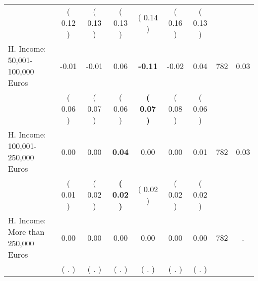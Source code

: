 \begin{tabular}{lcccccccc}
 & (     0.12 ) & (     0.13 ) & (     0.13 ) & (     0.14 ) & (     0.16 ) & (     0.13 ) & \\
H. Income: 50,001-100,000 Euros &     -0.01 &     -0.01 &      0.06 & \textbf{    -0.11} &     -0.02 &      0.04 & 782 &       0.03 \\ 
 & (     0.06 ) & (     0.07 ) & (     0.06 ) & \textbf{(     0.07 )} & (     0.08 ) & (     0.06 ) & \\
H. Income: 100,001-250,000 Euros &      0.00 &      0.00 & \textbf{     0.04} &      0.00 &      0.00 &      0.01 & 782 &       0.03 \\ 
 & (     0.01 ) & (     0.02 ) & \textbf{(     0.02 )} & (     0.02 ) & (     0.02 ) & (     0.02 ) & \\
H. Income: More than 250,000 Euros &      0.00 &      0.00 &      0.00 &      0.00 &      0.00 &      0.00 & 782 &          . \\ 
 & (        . ) & (        . ) & (        . ) & (        . ) & (        . ) & (        . ) & \\
\bottomrule
\end{tabular}
